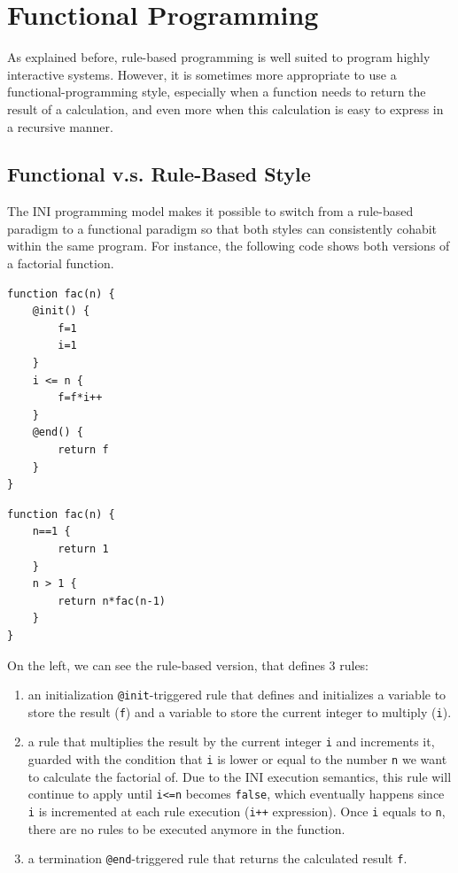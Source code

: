 \documentclass{sig-alternate}
\begin{document}
\section{Functional Programming}

As explained before, rule-based programming is well suited to program highly interactive systems. However, it is sometimes more appropriate to use a functional-programming style, especially when a function needs to return the result of a calculation, and even more when this calculation is easy to express in a recursive manner.

\subsection{Functional v.s. Rule-Based Style\label{subsec:functional_style}}

The INI programming model makes it possible to switch from a rule-based paradigm to a functional paradigm so that both styles can consistently cohabit within the same program. For instance, the following code shows both versions of a factorial function. 

\noindent
\begin{minipage}[t]{0.5\linewidth}\centering
\begin{lstlisting}[numbers=none]
function fac(n) {
	@init() {
		f=1
		i=1
	}
	i <= n {
		f=f*i++
	}
	@end() {
		return f
	}
}
\end{lstlisting} 
\end{minipage}
\begin{minipage}[t]{0.5\linewidth}\centering
\begin{lstlisting}[numbers=none]
function fac(n) {
	n==1 {
		return 1
	}
	n > 1 {
		return n*fac(n-1)
	}
}
\end{lstlisting}
\end{minipage}

On the left, we can see the rule-based version, that defines 3 rules:

\begin{enumerate}
\item an initialization \texttt{@init}-triggered rule that defines and initializes a variable to store the result (\texttt{f}) and a variable to store the current integer to multiply (\texttt{i}).
\item a rule that multiplies the result by the current integer \texttt{i} and increments it, guarded with the condition that \texttt{i} is lower or equal to the number \texttt{n} we want to calculate the factorial of. Due to the INI execution semantics, this rule will continue to apply until \texttt{i<=n} becomes \texttt{false}, which eventually happens since \texttt{i} is incremented at each rule execution (\texttt{i++} expression). Once \texttt{i} equals to \texttt{n}, there are no rules to be executed anymore in the function.
\item a termination \texttt{@end}-triggered rule that returns the calculated result \texttt{f}.
\end{enumerate}
\end{document}
